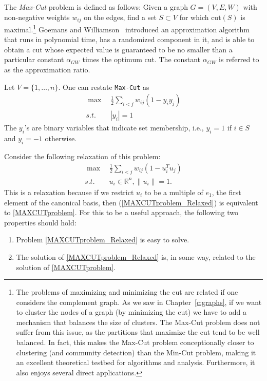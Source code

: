 The \emph{Max-Cut} problem is defined as follows: Given a graph $G=(V,E,W)$ with non-negative weights $w_{ij}$ on the edges, find a set $S\subset V$ for which $\text{cut}(S)$ is maximal.\footnote{The problems of maximizing and minimizing the cut are related if one considers the complement graph. As we saw in Chapter~\ref{c:graphs}, if we want to cluster the nodes of a graph (by minimizing the cut) we have to add a mechanism that balances the size of clusters. The Max-Cut problem does not suffer from this issue, as the partitions that maximize the cut tend to be well balanced. In fact, this makes the Max-Cut problem conceptionally closer to clustering (and community detection) than the Min-Cut problem, making it an excellent theoretical testbed for algorithms and analysis. Furthermore, it also enjoys several direct applications.}
Goemans and Williamson~\cite{MXGoemans_DPWilliamson_1995} introduced an approximation algorithm that runs in polynomial time, has a randomized component in it, and is able to obtain a cut whose expected value is guaranteed to be no smaller than a particular constant $\alpha_{GW}$ times the optimum cut. The constant $\alpha_{GW}$ is referred to as the approximation ratio.

Let $V=\{1,\ldots,n\}$. One can restate \texttt{Max-Cut} as
\begin{equation}\label{MAXCUTproblem}
\begin{array}{l}
\max \quad  \frac12 \sum_{i<j}w_{ij}(1-y_iy_j) \\
s.t. \quad \quad  |y_i|=1
\end{array}
\end{equation}
The $y_i$'s are binary variables that indicate set membership, i.e., $y_i=1$ if $i\in S$ and $y_i=-1$ otherwise.


Consider the following relaxation of this problem:
\begin{equation}\label{MAXCUTproblem_Relaxed}
\begin{array}{l}
\max \quad  \frac12 \sum_{i<j}w_{ij}(1-u_i^Tu_j) \\
s.t. \quad \quad  u_i\in \mathbb{R}^n, \|u_i\|=1.
\end{array}
\end{equation}
This is a relaxation because if we restrict $u_i$ to be a multiple of $e_1$, the first element of the canonical basis, then (\ref{MAXCUTproblem_Relaxed}) is equivalent to \eqref{MAXCUTproblem}. For this to be a useful approach, the following two properties should hold:
 \begin{enumerate}[{(a)}]

 \item \label{it-1} Problem \eqref{MAXCUTproblem_Relaxed} is easy to solve.
 \item \label{it-2} The solution of \eqref{MAXCUTproblem_Relaxed} is, in some way, related to the solution of \eqref{MAXCUTproblem}.
 \end{enumerate}
 
